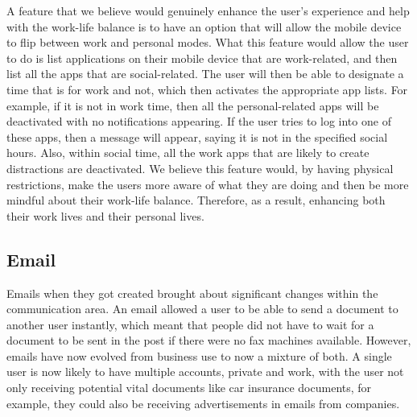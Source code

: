 \documentclass{sigchi}
\begin{document}
		A feature that we believe would genuinely enhance the user's experience and help with the work-life balance is to have an option that will allow the mobile device to flip between work and personal modes. What this feature would allow the user to do is list applications on their mobile device that are work-related, and then list all the apps that are social-related. The user will then be able to designate a time that is for work and not, which then activates the appropriate app lists. For example, if it is not in work time, then all the personal-related apps will be deactivated with no notifications appearing. If the user tries to log into one of these apps, then a message will appear, saying it is not in the specified social hours. Also, within social time, all the work apps that are likely to create distractions are deactivated. We believe this feature would, by having physical restrictions, make the users more aware of what they are doing and then be more mindful about their work-life balance. Therefore, as a result, enhancing both their work lives and their personal lives.	
		
	\subsection{Email}
		Emails when they got created brought about significant changes within the communication area. An email allowed a user to be able to send a document to another user instantly, which meant that people did not have to wait for a document to be sent in the post if there were no fax machines available. However, emails have now evolved from business use to now a mixture of both. A single user is now likely to have multiple accounts, private and work, with the user not only receiving potential vital documents like car insurance documents, for example, they could also be receiving advertisements in emails from companies.
		
\end{document}
